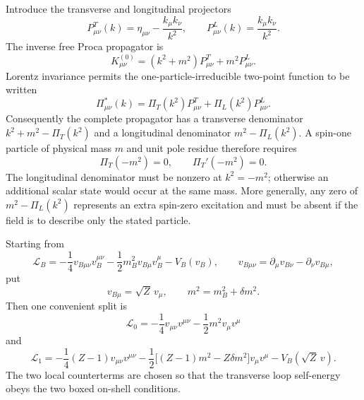 \ExerciseEditorialNote

\begin{enumerate}
Introduce the transverse and longitudinal projectors
\[
 P^T_{\mu\nu}(k)=\eta_{\mu\nu}-\frac{k_\mu k_\nu}{k^2},
 \qquad
 P^L_{\mu\nu}(k)=\frac{k_\mu k_\nu}{k^2}.
\]
The inverse free Proca propagator is
\[
 K^{(0)}_{\mu\nu}
 =(k^2+m^2)P^T_{\mu\nu}+m^2P^L_{\mu\nu}.
\]
Lorentz invariance permits the one-particle-irreducible two-point
function to be written
\[
 \Pi^*_{\mu\nu}(k)
 =\Pi_T(k^2)P^T_{\mu\nu}+\Pi_L(k^2)P^L_{\mu\nu}.
\]
Consequently the complete propagator has a transverse denominator
\(k^2+m^2-\Pi_T(k^2)\) and a longitudinal denominator
\(m^2-\Pi_L(k^2)\).  A spin-one particle of physical mass \(m\) and unit
pole residue therefore requires
\[
 \boxed{\Pi_T(-m^2)=0,\qquad \Pi_T'(-m^2)=0.}
\]
The longitudinal denominator must be nonzero at \(k^2=-m^2\); otherwise
an additional scalar state would occur at the same mass.  More generally,
any zero of \(m^2-\Pi_L(k^2)\) represents an extra spin-zero excitation
and must be absent if the field is to describe only the stated particle.

Starting from
\[
 \mathcal L_B=-\frac14v_{B\mu\nu}v_B^{\mu\nu}
 -\frac12m_B^2v_{B\mu}v_B^\mu-V_B(v_B),
 \qquad
 v_{B\mu\nu}=\partial_\mu v_{B\nu}-\partial_\nu v_{B\mu},
\]
put
\[
 v_{B\mu}=\sqrt Z\,v_\mu,\qquad
 m^2=m_B^2+\delta m^2.
\]
Then one convenient split is
\[
 \mathcal L_0=-\frac14v_{\mu\nu}v^{\mu\nu}
 -\frac12m^2v_\mu v^\mu
\]
and
\[
 \mathcal L_1=-\frac14(Z-1)v_{\mu\nu}v^{\mu\nu}
 -\frac12\bigl[(Z-1)m^2-Z\delta m^2\bigr]v_\mu v^\mu
 -V_B(\sqrt Z\,v).
\]
The two local counterterms are chosen so that the transverse loop
self-energy obeys the two boxed on-shell conditions.


\end{enumerate}
